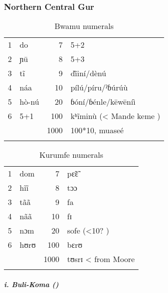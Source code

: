 \subsubsection{Northern Central Gur}%
\begin{table}
\caption{\label{tab:3:164}Bwamu numerals}


\begin{tabularx}{\textwidth}{lXrX}
\lsptoprule

{1} & do & {7} & 5+2\\
{2} & ɲ{\={u}} & {8} & 5+3\\
{3} & t{\~{i}} & {9} & d{\`ĩ}iní/dèn{\'{u}}\\
{4} & náa & {10} & píl{\'{u}}/píru/ˀɓ{\'{u}}r{\'{u}}{\`{u}}\\
{5} & hò-n{\'{u}} & {20} & ɓóní/ɓénle/k{\={e}}w{\={e}}níì\\
{6} & 5+1 & {100} & kʰ{\~{i}}min{\`{u}} (< Mande keme )\\
&  & {1000} & 100*10, muaseé\\
\lspbottomrule
\end{tabularx}
\end{table}

\begin{table}
\caption{\label{tab:3:165}Kurumfe numerals}


\begin{tabularx}{\textwidth}{lXrX}
\lsptoprule

{1} & dom & {7} & p{\~{ɛ}}{\~{ɛ}}\\
{2} & h{\~{i}}{\~{i}} & {8} & tɔɔ\\
{3} & t{\~{a}}{\~{a}} & {9} & fa\\
{4} & n{\~{a}}{\~{a}} & {10} & fɪ\\
{5} & nɔm & {20} & sofe (<10? )\\
{6} & hʊrʊ & {100} & bɛrʊ\\
&  & {1000} & tʊsrɪ < from Moore\\
\lspbottomrule
\end{tabularx}
\end{table}

\clearpage 
{}%
\subparagraph{i. Buli-Koma ()}

